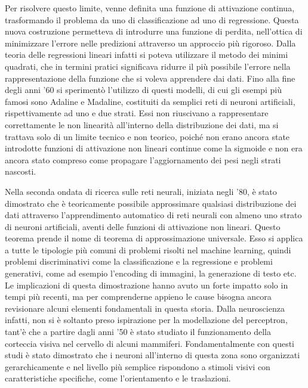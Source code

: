 \noindent Per risolvere questo limite, venne definita una funzione di attivazione continua, trasformando il problema da uno di classificazione ad uno di regressione. Questa nuova costruzione permetteva di introdurre una funzione di perdita, nell'ottica di minimizzare l'errore nelle predizioni attraverso un approccio più rigoroso. Dalla teoria delle regressioni lineari infatti si poteva utilizzare il metodo dei minimi quadrati, che in termini pratici significava ridurre il più possibile l'errore nella rappresentazione della funzione che si voleva apprendere dai dati. Fino alla fine degli anni '60 si sperimentò l'utilizzo di questi modelli, di cui gli esempi più famosi sono Adaline e Madaline, costituiti da semplici reti di neuroni artificiali, rispettivamente ad uno e due strati. Essi non riuscivano a rappresentare correttamente le non linearità all'interno della distribuzione dei dati, ma si trattava solo di un limite tecnico e non teorico, poiché non erano ancora state introdotte funzioni di attivazione non lineari continue come la sigmoide e non era ancora stato compreso come propagare l'aggiornamento dei pesi negli strati nascosti. 

\noindent Nella seconda ondata di ricerca sulle reti neurali, iniziata negli '80, è stato dimostrato che è teoricamente possibile approssimare qualsiasi distribuzione dei dati attraverso l'apprendimento automatico di reti neurali con almeno uno strato di neuroni artificiali, aventi delle funzioni di attivazione non lineari. Questo teorema prende il nome di teorema di approssimazione universale. Esso si applica a tutte le tipologie più comuni di problemi risolti nel machine learning, quindi problemi discriminativi come la classificazione e la regressione e problemi generativi, come ad esempio l'encoding di immagini, la generazione di testo etc. Le implicazioni di questa dimostrazione hanno avuto un forte impatto solo in tempi più recenti, ma per comprenderne appieno le cause bisogna ancora revisionare alcuni elementi fondamentali in questa storia. Dalla neuroscienza infatti, non si è soltanto preso ispirazione per la modellazione del perceptron, tant'è che a partire dagli anni '50 è stato studiato il funzionamento della corteccia visiva nel cervello di alcuni mammiferi. Fondamentalmente con questi studi è stato dimostrato che i neuroni all'interno di questa zona sono organizzati gerarchicamente e nel livello più semplice rispondono a stimoli visivi con caratteristiche specifiche, come l'orientamento e le traslazioni. 


